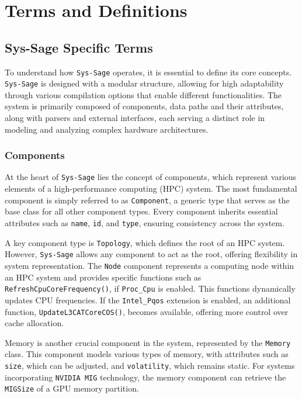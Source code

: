 \chapter{Terms and Definitions}\label{chapter:terms_and_definition}

\section{Sys-Sage Specific Terms}

To understand how \texttt{Sys-Sage} operates, it is essential to define its core concepts. \texttt{Sys-Sage} is designed with a modular structure, allowing for high adaptability through various compilation options that enable different functionalities. The system is primarily composed of components, data paths and their attributes, along with parsers and external interfaces, each serving a distinct role in modeling and analyzing complex hardware architectures.

\subsection{Components }

At the heart of \texttt{Sys-Sage} lies the concept of components, which represent various elements of a high-performance computing (\ac{HPC}) system. The most fundamental component is simply referred to as \texttt{Component}, a generic type that serves as the base class for all other component types. Every component inherits essential attributes such as \texttt{name}, \texttt{id}, and \texttt{type}, ensuring consistency across the system. \cite[see Component]{sys-sage-docu}

A key component type is \texttt{Topology}, which defines the root of an \ac{HPC} system. However, \texttt{Sys-Sage} allows any component to act as the root, offering flexibility in system representation. The \texttt{Node} component represents a computing node within an \ac{HPC} system and provides specific functions such as \texttt{RefreshCpuCoreFrequency()}, if \texttt{Proc\_Cpu} is enabled. This functions dynamically updates CPU frequencies. If the \texttt{Intel\_Pqos} extension is enabled, an additional function, \texttt{UpdateL3CATCoreCOS()}, becomes available, offering more control over cache allocation.

Memory is another crucial component in the system, represented by the \texttt{Memory} class. This component models various types of memory, with attributes such as \texttt{size}, which can be adjusted, and \texttt{volatility}, which remains static. For systems incorporating \texttt{NVIDIA MIG} technology, the memory component can retrieve the \texttt{MIGSize} of a \ac{GPU} memory partition.

